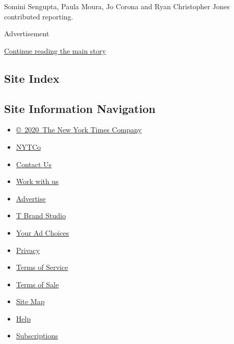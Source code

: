Somini Sengupta, Paula Moura, Jo Corona and Ryan Christopher Jones
contributed reporting.

Advertisement

\protect\hyperlink{after-bottom}{Continue reading the main story}

\hypertarget{site-index}{%
\subsection{Site Index}\label{site-index}}

\hypertarget{site-information-navigation}{%
\subsection{Site Information
Navigation}\label{site-information-navigation}}

\begin{itemize}
\tightlist
\item
  \href{https://help.nytimes3xbfgragh.onion/hc/en-us/articles/115014792127-Copyright-notice}{©~2020~The
  New York Times Company}
\end{itemize}

\begin{itemize}
\tightlist
\item
  \href{https://www.nytco.com/}{NYTCo}
\item
  \href{https://help.nytimes3xbfgragh.onion/hc/en-us/articles/115015385887-Contact-Us}{Contact
  Us}
\item
  \href{https://www.nytco.com/careers/}{Work with us}
\item
  \href{https://nytmediakit.com/}{Advertise}
\item
  \href{http://www.tbrandstudio.com/}{T Brand Studio}
\item
  \href{https://www.nytimes3xbfgragh.onion/privacy/cookie-policy\#how-do-i-manage-trackers}{Your
  Ad Choices}
\item
  \href{https://www.nytimes3xbfgragh.onion/privacy}{Privacy}
\item
  \href{https://help.nytimes3xbfgragh.onion/hc/en-us/articles/115014893428-Terms-of-service}{Terms
  of Service}
\item
  \href{https://help.nytimes3xbfgragh.onion/hc/en-us/articles/115014893968-Terms-of-sale}{Terms
  of Sale}
\item
  \href{https://spiderbites.nytimes3xbfgragh.onion}{Site Map}
\item
  \href{https://help.nytimes3xbfgragh.onion/hc/en-us}{Help}
\item
  \href{https://www.nytimes3xbfgragh.onion/subscription?campaignId=37WXW}{Subscriptions}
\end{itemize}
